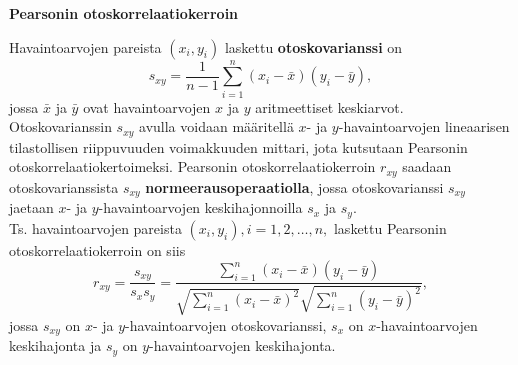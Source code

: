 \documentclass[
]{book}
\begin{document}
\begin{defblock}{}
\textbf{Pearsonin otoskorrelaatiokerroin}

Havaintoarvojen pareista \((x_i, y_i)\) laskettu \textbf{otoskovarianssi} on
\[
s_{xy} = \frac{1}{n-1} \sum_{i=1}^{n} (x_i - \bar{x}) (y_i - \bar{y}),
\]
jossa \(\bar{x}\) ja \(\bar{y}\) ovat havaintoarvojen \(x\) ja \(y\) aritmeettiset keskiarvot.\\
Otoskovarianssin \(s_{xy}\) avulla voidaan määritellä \(x\)- ja \(y\)-havaintoarvojen lineaarisen tilastollisen riippuvuuden voimakkuuden mittari, jota kutsutaan Pearsonin otoskorrelaatiokertoimeksi. Pearsonin otoskorrelaatiokerroin \(r_{xy}\) saadaan otoskovarianssista \(s_{xy}\) \textbf{normeerausoperaatiolla}, jossa otoskovarianssi \(s_{xy}\) jaetaan \(x\)- ja \(y\)-havaintoarvojen keskihajonnoilla \(s_x\) ja \(s_y\).\\
Ts. havaintoarvojen pareista \((x_i, y_i), i = 1, 2, \ldots, n,\) laskettu Pearsonin otoskorrelaatiokerroin on siis
\[
r_{xy} = \frac{s_{xy}}{s_x s_y} = \frac{\sum_{i=1}^{n} (x_i - \bar{x}) (y_i - \bar{y})}{\sqrt{\sum_{i=1}^{n} (x_i - \bar{x})^2} \sqrt{\sum_{i=1}^{n} (y_i - \bar{y})^2}} , 
\]
jossa \(s_{xy}\) on \(x\)- ja \(y\)-havaintoarvojen otoskovarianssi, \(s_x\) on \(x\)-havaintoarvojen keskihajonta ja \(s_y\) on \(y\)-havaintoarvojen keskihajonta.

\end{defblock}
\end{document}

